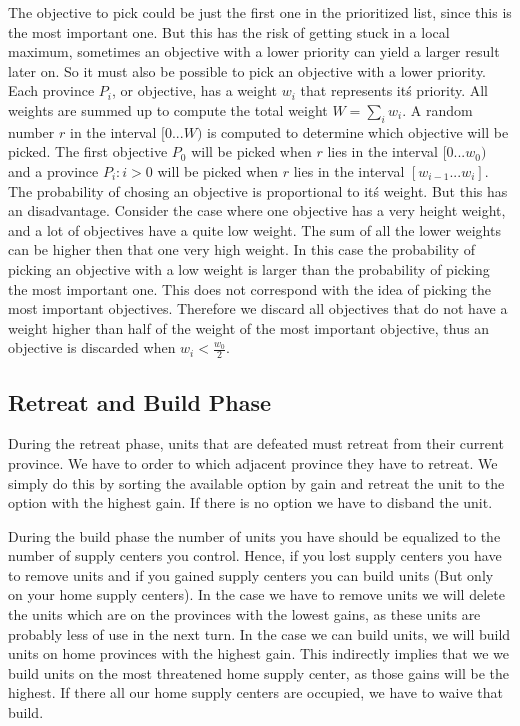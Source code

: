\documentclass[a4paper]{article} %
\begin{document}
The objective to pick could be just the first one in the prioritized list, since this is the most important one. But this has the risk of getting stuck in a local maximum, sometimes an objective with a lower priority can yield a larger result later on. So it must also be possible to pick an objective with a lower priority. Each province $P_{i}$, or objective, has a weight $w_{i}$ that represents it\'s priority. All weights are summed up to compute the total weight $W=\sum_{i}w_{i}$. A random number $r$ in the interval $[0...W)$ is computed to determine which objective will be picked. The first objective $P_{0}$ will be picked when $r$ lies in the interval $[0...w_{0})$ and a province $P_{i}:i>0$ will be picked when $r$ lies in the interval $[w_{i-1}...w_{i}]$. The probability of chosing an objective is proportional to it\'s weight. But this has an disadvantage. Consider the case where one objective has a very height weight, and a lot of objectives have a quite low weight. The sum of all the lower weights can be higher then that one very high weight. In this case the probability of picking an objective with a low weight is larger than the probability of picking the most important one. This does not correspond with the idea of picking the most important objectives. Therefore we discard all objectives that do not have a weight higher than half of the weight of the most important objective, thus an objective is discarded when $w_{i} < \frac{w_{0}}{2}$.

\subsection{Retreat and Build Phase}

During the retreat phase, units that are defeated must retreat from their current province. We have to order to which adjacent province they have to retreat. We simply do this by sorting the available option by gain and retreat the unit to the option with the highest gain. If there is no option we have to disband the unit. 

During the build phase the number of units you have should be equalized to the number of supply centers you control. Hence, if you lost supply centers you have to remove units and if you gained supply centers you can build units (But only on your home supply centers). In the case we have to remove units we will delete the units which are on the provinces with the lowest gains, as these units are probably less of use in the next turn. In the case we can build units, we will build units on home provinces with the highest gain. This indirectly implies that we we build units on the most threatened home supply center, as those gains will be the highest. If there all our home supply centers are occupied, we have to waive that build.    
\end{document}
